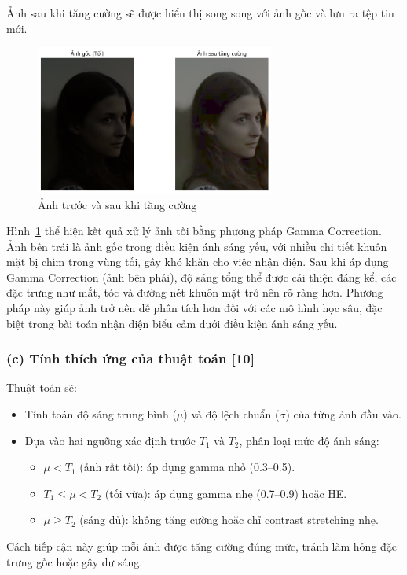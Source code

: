 Ảnh sau khi tăng cường sẽ được hiển thị song song với ảnh gốc và lưu ra tệp tin mới.


 \begin{figure}[H]
    \centering
    \includegraphics[width=0.7\textwidth]{img/anhsautangcuong.png} %
    \caption{Ảnh trước và sau khi tăng cường}
    \label{fig:emotion_distribution22}
\end{figure}

Hình~\ref{fig:emotion_distribution22} thể hiện kết quả xử lý ảnh tối bằng phương pháp Gamma Correction. Ảnh bên trái là ảnh gốc trong điều kiện ánh sáng yếu, với nhiều chi tiết khuôn mặt bị chìm trong vùng tối, gây khó khăn cho việc nhận diện. Sau khi áp dụng Gamma Correction (ảnh bên phải), độ sáng tổng thể được cải thiện đáng kể, các đặc trưng như mắt, tóc và đường nét khuôn mặt trở nên rõ ràng hơn. Phương pháp này giúp ảnh trở nên dễ phân tích hơn đối với các mô hình học sâu, đặc biệt trong bài toán nhận diện biểu cảm dưới điều kiện ánh sáng yếu.


\subsubsection*{(c) Tính thích ứng của thuật toán [10]}
Thuật toán sẽ:
\begin{itemize}[]
    \item Tính toán độ sáng trung bình ($\mu$) và độ lệch chuẩn ($\sigma$) của từng ảnh đầu vào.
    \item Dựa vào hai ngưỡng xác định trước $T_1$ và $T_2$, phân loại mức độ ánh sáng:
    \begin{itemize}[]
        \item $\mu < T_1$ (ảnh rất tối): áp dụng gamma nhỏ (0.3--0.5).
        \item $T_1 \le \mu < T_2$ (tối vừa): áp dụng gamma nhẹ (0.7--0.9) hoặc HE.
        \item $\mu \ge T_2$ (sáng đủ): không tăng cường hoặc chỉ contrast stretching nhẹ.
    \end{itemize}
\end{itemize}
Cách tiếp cận này giúp mỗi ảnh được tăng cường đúng mức, tránh làm hỏng đặc trưng gốc hoặc gây dư sáng.

